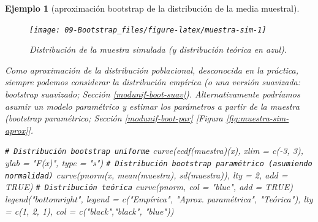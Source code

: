 \documentclass[
]{book}
\newenvironment{Shaded}{\begin{snugshade}}{\end{snugshade}}
\newcommand{\AttributeTok}[1]{\textcolor[rgb]{0.77,0.63,0.00}{#1}}
\newcommand{\CommentTok}[1]{\textcolor[rgb]{0.56,0.35,0.01}{\textit{#1}}}
\newcommand{\ConstantTok}[1]{\textcolor[rgb]{0.00,0.00,0.00}{#1}}
\newcommand{\DecValTok}[1]{\textcolor[rgb]{0.00,0.00,0.81}{#1}}
\newcommand{\FunctionTok}[1]{\textcolor[rgb]{0.00,0.00,0.00}{#1}}
\newcommand{\NormalTok}[1]{#1}
\newcommand{\SpecialCharTok}[1]{\textcolor[rgb]{0.00,0.00,0.00}{#1}}
\newcommand{\StringTok}[1]{\textcolor[rgb]{0.31,0.60,0.02}{#1}}
\theoremstyle{break}
\newtheorem{example}{Ejemplo}[chapter]
\theoremstyle{nonumberplain}
\renewcommand{\CommentTok}[1]{\textcolor[rgb]{0.41,0.41,0.41}{\texttt{#1}}}
\begin{document}
\begin{example}[aproximación bootstrap de la distribución de la media muestral]
\begin{figure}[!htb]

{\centering \texttt{[image: 09-Bootstrap\_files/figure-latex/muestra-sim-1]} 

}

\caption{Distribución de la muestra simulada (y distribución teórica en azul).}\label{fig:muestra-sim}
\end{figure}

Como aproximación de la distribución poblacional, desconocida en la práctica, siempre podemos considerar la distribución empírica (o una versión suavizada: bootstrap suavizado; Sección \ref{modunif-boot-suav}).
Alternativamente podríamos asumir un modelo paramétrico y estimar los parámetros a partir de la muestra (bootstrap paramétrico; Sección \ref{modunif-boot-par} {[}Figura \ref{fig:muestra-sim-aprox}{]}.

\begin{Shaded}
\begin{Highlighting}[]
\CommentTok{\# Distribución bootstrap uniforme}
\FunctionTok{curve}\NormalTok{(}\FunctionTok{ecdf}\NormalTok{(muestra)(x), }\AttributeTok{xlim =} \FunctionTok{c}\NormalTok{(}\SpecialCharTok{{-}}\DecValTok{3}\NormalTok{, }\DecValTok{3}\NormalTok{), }\AttributeTok{ylab =} \StringTok{"F(x)"}\NormalTok{, }\AttributeTok{type =} \StringTok{"s"}\NormalTok{)}
\CommentTok{\# Distribución bootstrap paramétrico (asumiendo normalidad)}
\FunctionTok{curve}\NormalTok{(}\FunctionTok{pnorm}\NormalTok{(x, }\FunctionTok{mean}\NormalTok{(muestra), }\FunctionTok{sd}\NormalTok{(muestra)), }\AttributeTok{lty =} \DecValTok{2}\NormalTok{, }\AttributeTok{add =} \ConstantTok{TRUE}\NormalTok{)}
\CommentTok{\# Distribución teórica}
\FunctionTok{curve}\NormalTok{(pnorm, }\AttributeTok{col =} \StringTok{"blue"}\NormalTok{, }\AttributeTok{add =} \ConstantTok{TRUE}\NormalTok{)}
\FunctionTok{legend}\NormalTok{(}\StringTok{"bottomright"}\NormalTok{, }\AttributeTok{legend =} \FunctionTok{c}\NormalTok{(}\StringTok{"Empírica"}\NormalTok{, }\StringTok{"Aprox. paramétrica"}\NormalTok{, }\StringTok{"Teórica"}\NormalTok{),}
       \AttributeTok{lty =} \FunctionTok{c}\NormalTok{(}\DecValTok{1}\NormalTok{, }\DecValTok{2}\NormalTok{, }\DecValTok{1}\NormalTok{), }\AttributeTok{col =} \FunctionTok{c}\NormalTok{(}\StringTok{"black"}\NormalTok{,}\StringTok{"black"}\NormalTok{, }\StringTok{"blue"}\NormalTok{))}
\end{Highlighting}
\end{Shaded}

\begin{figure}[!htb]


\end{figure}
\end{example}
\end{document}
